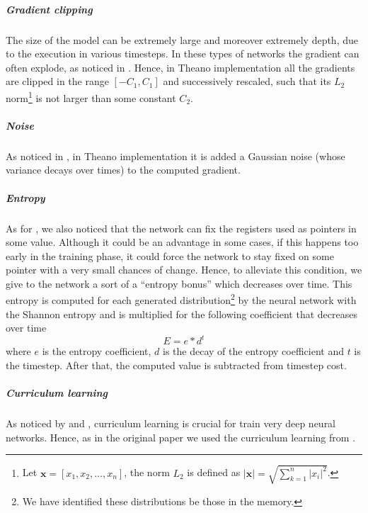 \subparagraph{Gradient clipping}
The size of the model can be extremely large and moreover extremely depth, due to the execution in various timesteps. In these types of networks the gradient can often explode, as noticed in \cite{Bengio1994LearningLD}. Hence, in Theano implementation all the gradients are clipped in the range $[-C_1, C_1]$ and successively rescaled, such that its $L_2$ norm\footnote{Let $\textbf{x} = [x_1, x_2, \dots, x_n]$, the norm $L_2$ is defined as $|\textbf{x}| = \sqrt{\sum\limits_{k=1}^{n}|x_i|^2}$.} is not larger than some constant $C_2$.

\subparagraph{Noise}
As noticed in \cite{Neelakantan2015AddingGN}, in Theano implementation it is added a Gaussian noise (whose variance decays over times) to the computed gradient.

\subparagraph{Entropy}
As for \cite{NRAM:2016}, we also noticed that the network can fix the registers used as pointers in some value. Although it could be an advantage in some cases, if this happens too early in the training phase, it could force the network to stay fixed on some pointer with a very small chances of change. Hence, to alleviate this condition, we give to the network a sort of a ``entropy bonus'' which decreases over time. This entropy is computed for each generated distribution\footnote{We have identified these distributions be those in the memory.} by the neural network with the Shannon entropy and is multiplied for the following coefficient that decreases over time
\begin{equation}
	E = e * d^{t}
\end{equation}
where $e$ is the entropy coefficient, $d$ is the decay of the entropy coefficient and $t$ is the timestep. After that, the computed value is subtracted from timestep cost.

\subparagraph{Curriculum learning}\label{subpar:curriculum-learning}
As noticed by \cite{Bengio2009CurriculumL} and \cite{Zaremba2014LearningTE}, curriculum learning is crucial for train very deep neural networks. Hence, as in the original paper we used the curriculum learning from \cite{Zaremba2014LearningTE}.

